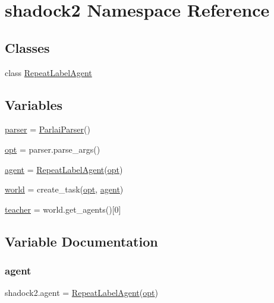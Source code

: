 \hypertarget{namespaceshadock2}{}\section{shadock2 Namespace Reference}
\label{namespaceshadock2}
\subsection*{Classes}
\begin{DoxyCompactItemize}
\item 
class \hyperlink{classshadock2_1_1RepeatLabelAgent}{Repeat\+Label\+Agent}
\end{DoxyCompactItemize}
\subsection*{Variables}
\begin{DoxyCompactItemize}
\item 
\hyperlink{namespaceshadock2_a89dd1b082837e937b1dacacec493a269}{parser} = \hyperlink{classparlai_1_1core_1_1params_1_1ParlaiParser}{Parlai\+Parser}()
\item 
\hyperlink{namespaceshadock2_ac16afc5d0983dc9d7e5608d98ef9c8cd}{opt} = parser.\+parse\+\_\+args()
\item 
\hyperlink{namespaceshadock2_a143910b54855edb0a70ffc547d2eb8d7}{agent} = \hyperlink{classshadock2_1_1RepeatLabelAgent}{Repeat\+Label\+Agent}(\hyperlink{namespaceshadock2_ac16afc5d0983dc9d7e5608d98ef9c8cd}{opt})
\item 
\hyperlink{namespaceshadock2_a3165bdff07a55337c2686e7c56b394e4}{world} = create\+\_\+task(\hyperlink{namespaceshadock2_ac16afc5d0983dc9d7e5608d98ef9c8cd}{opt}, \hyperlink{namespaceshadock2_a143910b54855edb0a70ffc547d2eb8d7}{agent})
\item 
\hyperlink{namespaceshadock2_a8f51abf464ce9479012a1e3b3a64668e}{teacher} = world.\+get\+\_\+agents()\mbox{[}0\mbox{]}
\end{DoxyCompactItemize}


\subsection{Variable Documentation}
\mbox{\label{namespaceshadock2_a143910b54855edb0a70ffc547d2eb8d7}} 
\subsubsection{\texorpdfstring{agent}{agent}}
{\footnotesize\ttfamily shadock2.\+agent = \hyperlink{classshadock2_1_1RepeatLabelAgent}{Repeat\+Label\+Agent}(\hyperlink{namespaceshadock2_ac16afc5d0983dc9d7e5608d98ef9c8cd}{opt})}

